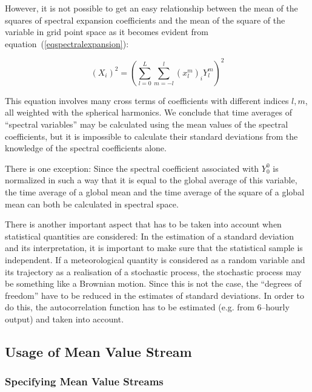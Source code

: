 \begin{appendix}
However, it is not possible to get an easy relationship between the
mean of the squares of spectral expansion coefficients and the mean of
the square of the variable in grid point space as it becomes evident
from equation~(\ref{eqspectralexpansion}): 

\begin{displaymath}
(X_i)^2=\left(\sum\limits_{l=0}^L\sum\limits_{m=-l}^l(x_l^m)_iY_l^m\right)^2
\end{displaymath}

This equation involves many cross terms of coefficients with different indices
$l,m$, all weighted with the spherical harmonics. We conclude that
time averages of ``spectral variables'' may be calculated using the
mean values of the spectral coefficients, but it is impossible to
calculate their standard deviations from the knowledge of the spectral
coefficients alone.

There is one exception: Since the spectral coefficient associated with
$Y_0^0$ is normalized in such a way that it is equal to the global
average of this variable, the time average of a global mean and the time
average of the
square of a global mean can both be calculated in spectral space.

There is another important aspect that has to be taken into account
when statistical quantities are considered: In the estimation of a
standard deviation and its interpretation, it is important to make
sure that the statistical sample is independent. If a meteorological
quantity is considered as a random variable and its trajectory as a
realisation of a stochastic process, the stochastic process may be
something like a Brownian motion. Since this is not the case, the
``degrees of freedom'' have to be reduced in the estimates of standard
deviations. In order to do this, the autocorrelation function has to
be estimated (e.g. from 6--hourly output) and taken into account.




\subsection{Usage of Mean Value Stream}

\subsubsection{Specifying Mean Value Streams}


\end{appendix}

